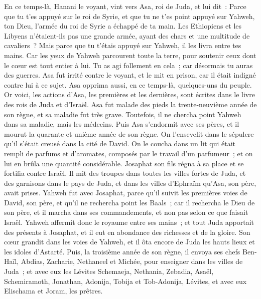 \begin{multicols}{2}
En ce temps-là, Hanani le voyant, vint vers Asa, roi de Juda, et lui dit~: Parce que tu t'es appuyé sur le roi de Syrie, et que tu ne t'es point appuyé sur Yahweh, ton Dieu, l'armée du roi de Syrie a échappé de ta main.
Les Ethiopiens et les Libyens n'étaient-ils pas une grande armée, ayant des chars et une multitude de cavaliers~? Mais parce que tu t'étais appuyé sur Yahweh, il les livra entre tes mains.
Car les yeux de Yahweh parcourent toute la terre, pour soutenir ceux dont le cœur est tout entier à lui. Tu as agi follement en cela~; car désormais tu auras des guerres.
Asa fut irrité contre le voyant, et le mit en prison, car il était indigné contre lui à ce sujet. Asa opprima aussi, en ce temps-là, quelques-uns du peuple.
Or voici, les actions d'Asa, les premières et les dernières, sont écrites dans le livre des rois de Juda et d'Israël.
Asa fut malade des pieds la trente-neuvième année de son règne, et sa maladie fut très grave. Toutefois, il ne chercha point Yahweh dans sa maladie, mais les médecins.
Puis Asa s'endormit avec ses pères, et il mourut la quarante et unième année de son règne.
On l'ensevelit dans le sépulcre qu'il s'était creusé dans la cité de David. On le coucha dans un lit qui était rempli de parfums et d'aromates, composés par le travail d'un parfumeur~; et on lui en brûla une quantité considérable.
\VerseOne{}Josaphat son fils régna à sa place et se fortifia contre Israël.
Il mit des troupes dans toutes les villes fortes de Juda, et des garnisons dans le pays de Juda, et dans les villes d'Ephraïm qu'Asa, son père, avait prises.
Yahweh fut avec Josaphat, parce qu'il suivit les premières voies de David, son père, et qu'il ne rechercha point les Baals~;
car il rechercha le Dieu de son père, et il marcha dans ses commandements, et non pas selon ce que faisait Israël.
Yahweh affermit donc le royaume entre ses mains~; et tout Juda apportait des présents à Josaphat, et il eut en abondance des richesses et de la gloire.
Son cœur grandit dans les voies de Yahweh, et il ôta encore de Juda les hauts lieux et les idoles d'Astarté.
Puis, la troisième année de son règne, il envoya ses chefs Ben-Haïl, Abdias, Zacharie, Nethaneel et Michée, pour enseigner dans les villes de Juda~;
et avec eux les Lévites Schemaeja, Nethania, Zebadia, Asaël, Schemiramoth, Jonathan, Adonija, Tobija et Tob-Adonija, Lévites, et avec eux Elischama et Joram, les prêtres.

\end{multicols}
